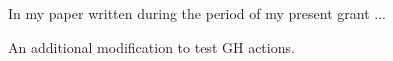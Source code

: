 


In my paper \cite{paper01} written during the period of my present
grant ... 

An additional modification to test GH actions.




